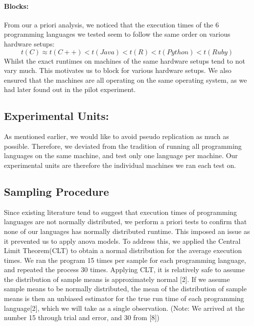 \documentclass[12pt,halfline,a4paper,]{ouparticle}
\begin{document}
\paragraph{Blocks:}\label{blocks}

From our a priori analysis, we noticed that the execution times of the 6
programming languages we tested seem to follow the same order on various
hardware setups: \begin{equation}
t(C) \approx t(C++) < t(Java) < t(R) < t(Python) < t(Ruby)
\end{equation} Whilst the exact runtimes on machines of the same
hardware setups tend to not vary much. This motivates us to block for
various hardware setups. We also ensured that the machines are all
operating on the same operating system, as we had later found out in the
pilot experiment.

\subsection{Experimental Units:}\label{experimental-units}

As mentioned earlier, we would like to avoid pseudo replication as much
as possible. Therefore, we deviated from the tradition of running all
programming languages on the same machine, and test only one language
per machine. Our experimental units are therefore the individual
machines we ran each test on.

\subsection{Sampling Procedure}\label{sampling-procedure}

Since existing literature tend to suggest that execution times of
programming languages are not normally distributed, we perform a priori
tests to confirm that none of our languages has normally distributed
runtime. This imposed an issue as it prevented us to apply anova models.
To address this, we applied the Central Limit Theorem(CLT) to obtain a
normal distribution for the average execution times. We ran the program
15 times per sample for each programming language, and repeated the
process 30 times. Applying CLT, it is relatively safe to assume the
distribution of sample means is approximately normal {[}2{]}. If we
assume sample means to be normally distributed, the mean of the
distribution of sample means is then an unbiased estimator for the true
run time of each programming language{[}2{]}, which we will take as a
single observation. (Note: We arrived at the number 15 through trial and
error, and 30 from {[}8{]})
\end{document}
